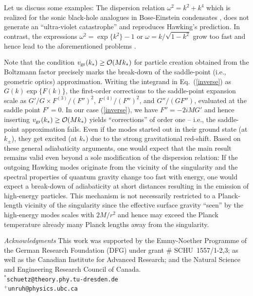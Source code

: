 \documentclass[aps,prl,showpacs,amssymb,nofootinbib,twocolumn]{revtex4}
\newcommand{\ord}{{\cal O}}
\begin{document}
Let us discuss some examples:
%
The dispersion relation $\omega^2=k^2+k^4$ which is realized for the
sonic black-hole analogues in Bose-Einstein condensates \cite{garay},
does not generate an ``ultra-violet catastrophe'' and reproduces
Hawking's prediction. 
%
In contrast, the expressions $\omega^2=\exp\{k^2\}-1$ or 
$\omega=k/\sqrt{1-k^2}$ grow too fast and hence lead to the
aforementioned problems \cite{motiv}.  

Note that the condition $v_{\rm gr}(k_*)\geq\ord(Mk_*)$ for particle
creation obtained from the Boltzmann factor precisely marks the
break-down of the saddle-point (i.e., geometric optics)
approximation. 
%
Writing the integrand in Eq.~(\ref{inverse}) as $G(k)\exp\{F(k)\}$,
the first-order corrections to the saddle-point expansion scale as 
$G'/G \times F^{(3)}/(F'')^2$, $F^{(4)}/(F'')^2$, and $G''/(GF'')$,
evaluated at the saddle point $F'=0$. 
%
In our case (\ref{inverse}), we have $F''=-2iMG'$ and hence inserting 
$v_{\rm gr}(k_*)\geq\ord(Mk_*)$ yields ``corrections'' of order one --
i.e., the  saddle-point approximation fails. 
%
Even if the modes started out in their ground state (at $k_\pm$), they 
get excited (at $k_*$) due to the strong gravitational red-shift. 
%
Based on these general adiabaticity arguments, one would expect that
the main result remains valid even beyond a sole modification of the
dispersion relation:
%
If the outgoing Hawking modes originate from the vicinity of the
singularity and the spectral properties of quantum gravity change too
fast with energy, one would expect a break-down of adiabaticity at
short distances resulting in the emission of high-energy particles. 
%
This mechanism is not necessarily restricted to a Planck-length
vicinity of the singularity since the effective surface gravity
``seen'' by the high-energy modes scales with $2M/r^2$ and hence may
exceed the Planck temperature already many Planck lengths away from
the singularity. 

{\em Acknowledgments}\quad
%
This work was supported by the Emmy-Noether Programme of the German
Research Foundation (DFG) under grant \# SCHU~1557/1-2,3; as well as 
the Canadian Institute for Advanced Research; and the
Natural Science and Engineering Research Council of Canada. 
%
\\
$^*${\tt schuetz@theory.phy.tu-dresden.de}
\\
$^+${\tt unruh@physics.ubc.ca}
\end{document}
